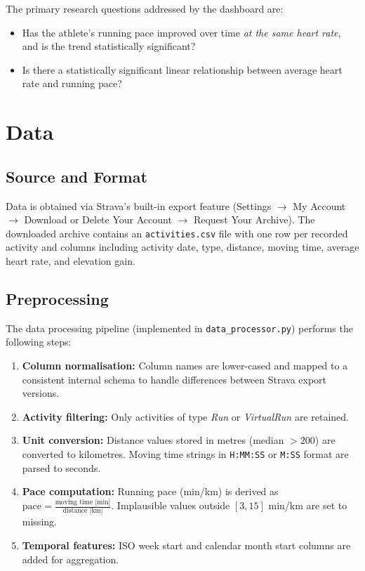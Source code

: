 \documentclass[conference]{IEEEtran}
\begin{document}
The primary research questions addressed by the dashboard are:
\begin{itemize}
    \item Has the athlete's running pace improved over time \textit{at the same heart rate}, and is the trend statistically significant?
    \item Is there a statistically significant linear relationship between average heart rate and running pace?
\end{itemize}

\section{Data}

\subsection{Source and Format}

Data is obtained via Strava's built-in export feature (Settings $\rightarrow$ My Account $\rightarrow$ Download or Delete Your Account $\rightarrow$ Request Your Archive). The downloaded archive contains an \texttt{activities.csv} file with one row per recorded activity and columns including activity date, type, distance, moving time, average heart rate, and elevation gain.

\subsection{Preprocessing}

The data processing pipeline (implemented in \texttt{data\_processor.py}) performs the following steps:

\begin{enumerate}
    \item \textbf{Column normalisation:} Column names are lower-cased and mapped to a consistent internal schema to handle differences between Strava export versions.
    \item \textbf{Activity filtering:} Only activities of type \textit{Run} or \textit{VirtualRun} are retained.
    \item \textbf{Unit conversion:} Distance values stored in metres (median $> 200$) are converted to kilometres. Moving time strings in \texttt{H:MM:SS} or \texttt{M:SS} format are parsed to seconds.
    \item \textbf{Pace computation:} Running pace (min/km) is derived as $\text{pace} = \frac{\text{moving time [min]}}{\text{distance [km]}}$. Implausible values outside $[3, 15]$ min/km are set to missing.
    \item \textbf{Temporal features:} ISO week start and calendar month start columns are added for aggregation.
\end{enumerate}
\end{document}
